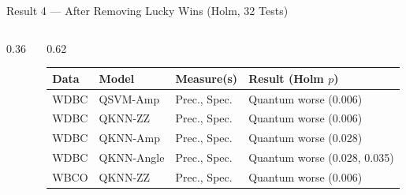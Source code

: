 \documentclass[aspectratio=169,11pt,t,xcolor={table}]{beamer}
\begin{document}
\begin{frame}{Result 4 --- After Removing Lucky Wins (Holm, 32 Tests)}
  \begin{columns}[T,onlytextwidth]
    \begin{column}{0.36\textwidth}
      \centering
      \par
    \end{column}
    \begin{column}{0.62\textwidth}
      \scriptsize
      \renewcommand{\arraystretch}{1.05}
      \begin{tabular}{@{}llll@{}}
        \toprule
        Data & Model & Measure(s) & Result (Holm $p$) \\
        \midrule
        WDBC & QSVM-Amp   & Prec., Spec. & \textcolor{qred}{Quantum worse} (0.006) \\
        WDBC & QKNN-ZZ    & Prec., Spec. & \textcolor{qred}{Quantum worse} (0.006) \\
        WDBC & QKNN-Amp   & Prec., Spec. & \textcolor{qred}{Quantum worse} (0.028) \\
        WDBC & QKNN-Angle & Prec., Spec. & \textcolor{qred}{Quantum worse} (0.028, 0.035) \\
        \midrule
        WBCO & QKNN-ZZ    & Prec., Spec. & \textcolor{qred}{Quantum worse} (0.006) \\
        \bottomrule
      \end{tabular}\par

\end{column}
\end{columns}
\end{frame}
\end{document}
